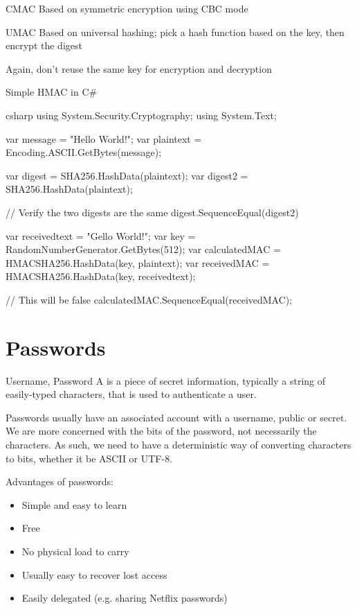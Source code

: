 \documentclass[12pt]{report}
\begin{document}
\begin{dfnbox}{CMAC}{}
    Based on symmetric encryption using CBC mode
\end{dfnbox}


\begin{dfnbox}{UMAC}{}
    Based on universal hashing; pick a hash function based on the key, then encrypt the digest
\end{dfnbox}

Again, don't reuse the same key for encryption and decryption

\begin{codebox}{Simple HMAC in C\#}{}{}
    \begin{amzcode}{csharp}
using System.Security.Cryptography;
using System.Text;

var message = "Hello World!";
var plaintext = Encoding.ASCII.GetBytes(message);

var digest = SHA256.HashData(plaintext);
var digest2 = SHA256.HashData(plaintext);

// Verify the two digests are the same
digest.SequenceEqual(digest2)

var receivedtext = "Gello World!";
var key = RandomNumberGenerator.GetBytes(512);
var calculatedMAC = HMACSHA256.HashData(key, plaintext);
var receivedMAC = HMACSHA256.HashData(key, receivedtext);

// This will be false
calculatedMAC.SequenceEqual(receivedMAC);
    \end{amzcode}
\end{codebox}

\section{Passwords}

\begin{dfnbox}{Username, Password}{}
    A  is a piece of secret information, typically a string of easily-typed characters, that is used to authenticate a user.
\end{dfnbox}


Passwords usually have an associated account with a username, public or secret. We are more concerned with the bits of the password, not necessarily the characters. As such, we need to have a deterministic way of converting characters to bits, whether it be ASCII or UTF-8.

Advantages of passwords:
\begin{itemize}[noitemsep]
    \item Simple and easy to learn
    \item Free
    \item No physical load to carry
    \item Usually easy to recover lost access
    \item Easily delegated (e.g. sharing Netflix passwords)
\end{itemize}
\end{document}
